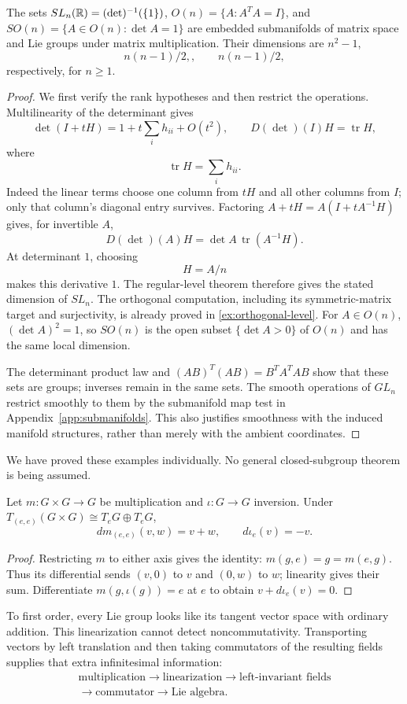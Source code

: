 \begin{proposition}\label{prop:matrix-lie-groups}
The sets $SL_n(\mathbb{R})=(\det)^{-1}(\{1\})$, $O(n)=\{A:A^TA=I\}$, and
$SO(n)=\{A\in O(n):\det A=1\}$ are embedded submanifolds of matrix
space and Lie groups under matrix multiplication. Their dimensions are
$n^2-1$,
\[
n(n-1)/2,,\qquad n(n-1)/2,
\]
 respectively, for $n\geq1$.
\end{proposition}
\begin{proof}
We first verify the rank hypotheses and then restrict the operations.
Multilinearity of the determinant gives
\[
\det(I+tH)=1+t\sum_i h_{ii}+O(t^2),\qquad
D(\det)(I)H=\operatorname{tr}H,
\]
where
\[
\operatorname{tr}H=\sum_i h_{ii}.
\]
 Indeed the linear terms choose
one column from $tH$ and all other columns from $I$; only that column's
diagonal entry survives. Factoring $A+tH=A(I+tA^{-1}H)$ gives, for
invertible $A$,
\[
D(\det)(A)H=\det A\,\operatorname{tr}(A^{-1}H).
\]
At determinant $1$, choosing
\[
H=A/n
\]
 makes this derivative $1$.
The regular-level theorem therefore gives the stated dimension of $SL_n$.
The orthogonal computation, including its symmetric-matrix target and
surjectivity, is already proved in \cref{ex:orthogonal-level}.
For $A\in O(n)$, $(\det A)^2=1$, so $SO(n)$ is the open subset
$\{\det A>0\}$ of $O(n)$ and has the same local dimension.

The determinant product law and $(AB)^T(AB)=B^TA^TAB$ show that these
sets are groups; inverses remain in the same sets. The smooth operations
of $GL_n$ restrict smoothly to them by the submanifold map test in
Appendix~\ref{app:submanifolds}. This also justifies smoothness with the
induced manifold structures, rather than merely with the ambient coordinates.
\end{proof}
We have proved these examples individually. No general closed-subgroup
theorem is being assumed.

\begin{proposition}
\label{prop:lie-first-order}
Let $m:G\times G\to G$ be multiplication and $\iota:G\to G$ inversion.
Under $T_{(e,e)}(G\times G)\cong T_eG\oplus T_eG$,
\[
dm_{(e,e)}(v,w)=v+w,\qquad d\iota_e(v)=-v.
\]
\end{proposition}
\begin{proof}
Restricting $m$ to either axis gives the identity: $m(g,e)=g=m(e,g)$.
Thus its differential sends $(v,0)$ to $v$ and $(0,w)$ to $w$;
linearity gives their sum. Differentiate $m(g,\iota(g))=e$ at $e$ to obtain
$v+d\iota_e(v)=0$.
\end{proof}
To first order, every Lie group looks like its tangent vector space with
ordinary addition. This linearization cannot detect noncommutativity.
Transporting vectors by left translation and then taking commutators of
the resulting fields supplies that extra infinitesimal information:
\[
\begin{gathered}
\text{multiplication}\longrightarrow\text{linearization}
\longrightarrow\text{left-invariant fields}\\
\longrightarrow\text{commutator}\longrightarrow\text{Lie algebra}.
\end{gathered}
\]

